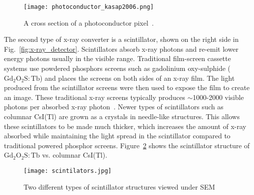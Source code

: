 \begin{figure}[ht]
\centering
\texttt{[image: photoconductor\_kasap2006.png]}
\caption{A cross section of a photoconductor pixel~\citep{kasap2006}.}
\label{fig:photoconductor_cross_section}
\end{figure}

The second type of x-ray converter is a scintillator, shown on the right side in Fig.~\ref{fig:x-ray_detector}.  Scintillators absorb x-ray photons and re-emit lower energy photons usually in the visible range.  Traditional film-screen cassette systems use powdered phosphors screens such as gadolinium oxy-sulphide ($\mathrm{Gd_2O_2S:Tb}$) and places the screens on both sides of an x-ray film.  The light produced from the scintillator screens were then used to expose the film to create an image.  These traditional x-ray screens typically produces $\sim$1000-2000 visible photons per absorbed x-ray photon~\citep{trauernicht1988, trauernicht1990}. Newer types of scintillators such as columnar CsI(Tl) are grown as a crystals in needle-like structures.  This allows these scintillators to be made much thicker, which increases the amount of x-ray absorbed while maintaining the light spread in the scintillator compared to traditional powered phosphor screens.  Figure~\ref{fig:scintillators} shows the scintillator structure of $\mathrm{Gd_2O_2S:Tb}$ vs. columnar CsI(Tl).

\begin{figure}[ht]
\texttt{[image: scintilators.jpg]}
\caption{Two different types of scintillator structures viewed under SEM~\citep{scintillatorImage}}
\label{fig:scintillators}
\end{figure}


